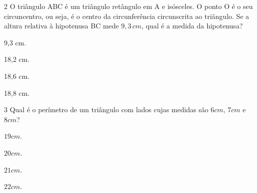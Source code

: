 {{{%


\num{2} O triângulo ABC é um triângulo retângulo em A e isósceles. O ponto O
é o seu circuncentro, ou seja, é o centro da circunferência circunscrita
ao triângulo. Se a altura relativa à hipotenusa BC mede $9,3\,cm$, qual é a
medida da hipotenusa?


\begin{escolha}[itemsep=0pt]
\item 9,3 cm.
\item 18,2 cm.
\item 18,6 cm.
\item 18,8 cm.
\end{escolha}







\num{3} Qual é o perímetro de um triângulo com lados cujas medidas são $6 cm$,
$7 cm$ e $8 cm$?

\begin{escolha}[itemsep=0pt]
\item $19 cm$.
\item $20 cm$.
\item $21 cm$.
\item $22 cm$.
\end{escolha}






}}}
